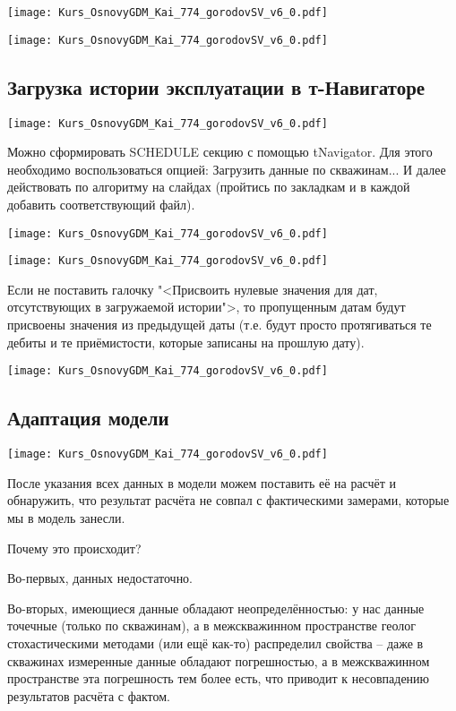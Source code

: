 \documentclass[main.tex]{subfiles}
\begin{document}
\texttt{[image: Kurs\_OsnovyGDM\_Kai\_774\_gorodovSV\_v6\_0.pdf]}

\texttt{[image: Kurs\_OsnovyGDM\_Kai\_774\_gorodovSV\_v6\_0.pdf]}

\subsection{Загрузка истории эксплуатации в т-Навигаторе}

\texttt{[image: Kurs\_OsnovyGDM\_Kai\_774\_gorodovSV\_v6\_0.pdf]}

Можно сформировать SCHEDULE секцию с помощью tNavigator.
Для этого необходимо воспользоваться опцией: Загрузить данные по скважинам...
И далее действовать по алгоритму на слайдах (пройтись по закладкам и в каждой добавить соответствующий файл).

\texttt{[image: Kurs\_OsnovyGDM\_Kai\_774\_gorodovSV\_v6\_0.pdf]}

\texttt{[image: Kurs\_OsnovyGDM\_Kai\_774\_gorodovSV\_v6\_0.pdf]}

Если не поставить галочку "<Присвоить нулевые значения для дат, отсутствующих в загружаемой истории">, то пропущенным датам будут присвоены значения из предыдущей даты (т.е. будут просто протягиваться те дебиты и те приёмистости, которые записаны на прошлую дату).

\texttt{[image: Kurs\_OsnovyGDM\_Kai\_774\_gorodovSV\_v6\_0.pdf]}

\subsection{Адаптация модели}

\texttt{[image: Kurs\_OsnovyGDM\_Kai\_774\_gorodovSV\_v6\_0.pdf]}

После указания всех данных в модели можем поставить её на расчёт и обнаружить, что результат расчёта не совпал с фактическими замерами, которые мы в модель занесли.

Почему это происходит?

Во-первых, данных недостаточно.

Во-вторых, имеющиеся данные обладают неопределённостью: у нас данные точечные (только по скважинам), а в межскважинном пространстве геолог стохастическими методами (или ещё как-то) распределил свойства -- даже в скважинах измеренные данные обладают погрешностью, а в межскважинном пространстве эта погрешность тем более есть, что приводит к несовпадению результатов расчёта с фактом.
\end{document}
